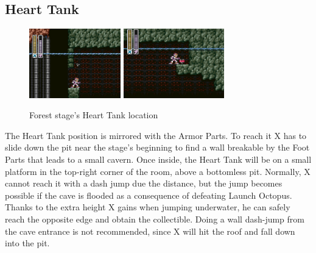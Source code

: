 \subsection{Heart Tank}
\begin{figure}[htp]
	\centering
		\centering
		\includegraphics[height=3cm]{figures/X1/Sting_chameleon/Sting_heart_1.jpg}
		\includegraphics[height=3cm]{figures/X1/Sting_chameleon/Sting_heart_2.jpg}
	\caption{Forest stage's Heart Tank location}
\end{figure}
The Heart Tank position is mirrored with the Armor Parts. To reach it X has to slide down the pit near the stage's beginning to find a wall breakable by the Foot Parts that leads to a small cavern. Once inside, the Heart Tank will be on a small platform in the top-right corner of the room, above a bottomless pit. Normally, X cannot reach it with a dash jump due the distance, but the jump becomes possible if the cave is flooded as a consequence of defeating Launch Octopus. Thanks to the extra height X gains when jumping underwater, he can safely reach the opposite edge and obtain the collectible. Doing a wall dash-jump from the cave entrance is not recommended, since X will hit the roof and fall down into the pit.


